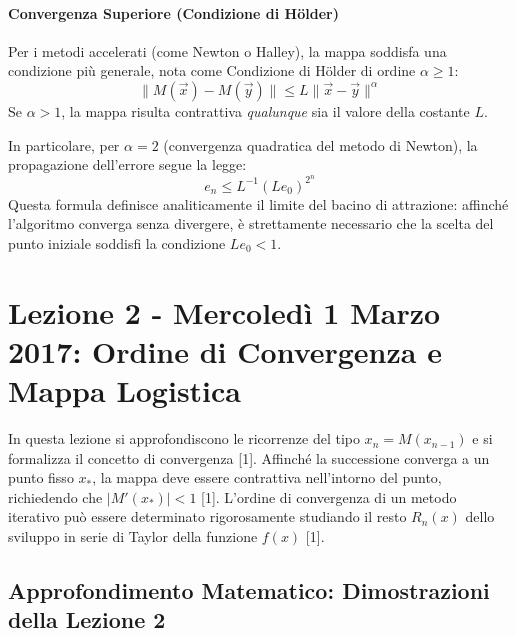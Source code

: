 \documentclass[12pt,a4paper]{article}
\begin{document}
\paragraph{Convergenza Superiore (Condizione di Hölder)}
Per i metodi accelerati (come Newton o Halley), la mappa soddisfa una condizione più generale, nota come Condizione di Hölder di ordine $\alpha \ge 1$:
\begin{equation}
\|M(\vec{x}) - M(\vec{y})\| \le L \|\vec{x} - \vec{y}\|^\alpha
\end{equation}
Se $\alpha > 1$, la mappa risulta contrattiva \textit{qualunque} sia il valore della costante $L$. 

In particolare, per $\alpha = 2$ (convergenza quadratica del metodo di Newton), la propagazione dell'errore segue la legge:
\begin{equation}
e_n \le L^{-1} (L e_0)^{2^n}
\end{equation}
Questa formula definisce analiticamente il limite del bacino di attrazione: affinché l'algoritmo converga senza divergere, è strettamente necessario che la scelta del punto iniziale soddisfi la condizione $L e_0 < 1$.

\newpage

\section{Lezione 2 - Mercoledì 1 Marzo 2017: Ordine di Convergenza e Mappa Logistica}

In questa lezione si approfondiscono le ricorrenze del tipo $x_n = M(x_{n-1})$ e si formalizza il concetto di convergenza [1]. Affinché la successione converga a un punto fisso $x_*$, la mappa deve essere contrattiva nell'intorno del punto, richiedendo che $|M'(x_*)| < 1$ [1]. L'ordine di convergenza di un metodo iterativo può essere determinato rigorosamente studiando il resto $R_n(x)$ dello sviluppo in serie di Taylor della funzione $f(x)$ [1].

\subsection*{Approfondimento Matematico: Dimostrazioni della Lezione 2}
\end{document}
